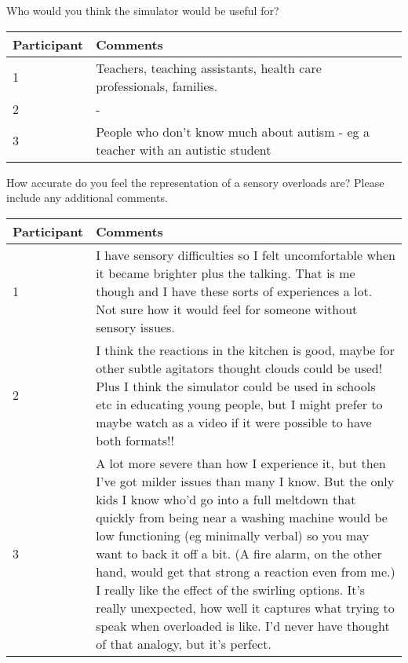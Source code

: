 Who would you think the simulator would be useful for?
\begin{table}[H]
    \begin{tabular}{| p{3cm} | p{12cm} |}
    \hline
     Participant & Comments \\ \hline
     1 & Teachers, teaching assistants, health care professionals, families. \\ \hline
     2 & - \\ \hline
     3 & People who don't know much about autism - eg a teacher with an autistic student \\ \hline
    \end{tabular}
\end{table}

How accurate do you feel the representation of a sensory overloads are? Please include any additional comments.
\begin{table}[H]
    \begin{tabular}{| p{3cm} | p{12cm} |}
    \hline
     Participant & Comments \\ \hline
     1 & I have sensory difficulties so I felt uncomfortable when it became brighter plus the talking. That is me though and I have these sorts of experiences a lot. Not sure how it would feel for someone without sensory issues. \\ \hline
     2 & I think the reactions in the kitchen is good, maybe for other subtle agitators thought clouds could be used! Plus I think the simulator could be used in schools etc in educating young people, but I might prefer to maybe watch as a video if it were possible to have both formats!! \\ \hline
     3 & A lot more severe than how I experience it, but then I've got milder issues than many I know. But the only kids I know who'd go into a full meltdown that quickly from being near a washing machine would be low functioning (eg minimally verbal) so you may want to back it off a bit. (A fire alarm, on the other hand, would get that strong a reaction even from me.) I really like the effect of the swirling options. It's really unexpected, how well it captures what trying to speak when overloaded is like. I'd never have thought of that analogy, but it's perfect. \\ \hline
    \end{tabular}
\end{table}

